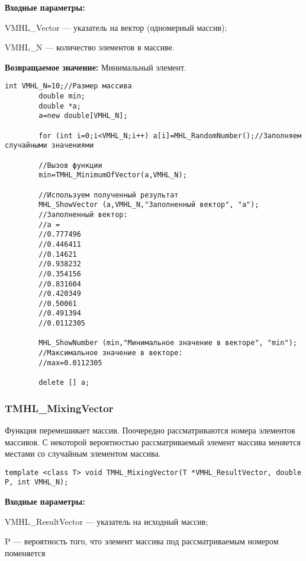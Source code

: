 \documentclass[a4paper,12pt]{article}
\begin{document}
\textbf{Входные параметры:}

 VMHL\_Vector --- указатель на вектор (одномерный массив);
 
 VMHL\_N --- количество элементов в массиве.

\textbf{Возвращаемое значение:}
Минимальный элемент.


\begin{lstlisting}[label=code_use_TMHL_MinimumOfVector,caption=Пример использования]
        int VMHL_N=10;//Размер массива
        double min;
        double *a;
        a=new double[VMHL_N];

        for (int i=0;i<VMHL_N;i++) a[i]=MHL_RandomNumber();//Заполняем случайными значениями

        //Вызов функции
        min=TMHL_MinimumOfVector(a,VMHL_N);

        //Используем полученный результат
        MHL_ShowVector (a,VMHL_N,"Заполненный вектор", "a");
        //Заполненный вектор:
        //a =
        //0.777496
        //0.446411
        //0.14621
        //0.938232
        //0.354156
        //0.831604
        //0.420349
        //0.50061
        //0.491394
        //0.0112305

        MHL_ShowNumber (min,"Минимальное значение в векторе", "min");
        //Максимальное значение в векторе:
        //max=0.0112305

        delete [] a;
\end{lstlisting}

\subsubsection{TMHL\_MixingVector}\label{TMHL_MixingVector}

Функция перемешивает массив. Поочередно рассматриваются номера элементов массивов. С некоторой вероятностью рассматриваемый элемент массива меняется местами со случайным элементом массива.


\begin{lstlisting}[label=code_syntax_TMHL_MixingVector,caption=Синтаксис]
template <class T> void TMHL_MixingVector(T *VMHL_ResultVector, double P, int VMHL_N);
\end{lstlisting}

\textbf{Входные параметры:}  
 
VMHL\_ResultVector --- указатель на исходный массив;
 
P --- вероятность того, что элемент массива под рассматриваемым номером поменяется
 
\end{document}
